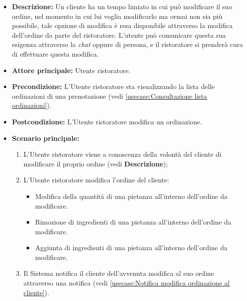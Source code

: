 \label{usecase:Modifica ordinazione}
\begin{itemize}

    \item \textbf{Descrizione:} Un cliente ha un tempo limiato in cui può modificare il suo ordine, nel momento in cui lui voglia modificarlo ma ormai non sia più possibile, tale opzione di modifica è resa disponibile 
    attraverso la modifica dell'ordine da parte del ristoratore. L'utente può comunicare questa sua esigenza attraverso la \textit{chat} oppure di persona, e il ristoratore si prenderà cura di effettuare questa modifica.
	
    \item \textbf{Attore principale:} Utente ristoratore.

	\item \textbf{Precondizione:} L'Utente ristoratore sta visualizzando la lista delle ordinazioni di una prenotazione (vedi \autoref{usecase:Consultazione lista ordinazioni}).

	\item \textbf{Postcondizione:} L'Utente ristoratore modifica un ordinazione.

	\item \textbf{Scenario principale:}
	\begin{enumerate}
		\item L'Utente ristoratore viene a conoscenza della volontà del cliente di modificare il proprio ordine (vedi \textbf{Descrizione});
		\item L'Utente ristoratore modifica l'ordine del cliente:
		\begin{itemize}
            \item Modifica della quantità di una pietanza all'interno dell'ordine da modificare.
			\item Rimozione di ingredienti di una pietanza all'interno dell'ordine da modificare.
			\item Aggiunta di ingredienti di una pietanza all'interno dell'ordine da modificare.
        \end{itemize}
        \item Il Sistema notifica il cliente dell'avvenuta modifica al suo ordine attraverso una notifica (vedi \autoref{usecase:Notifica modifica ordinazione al cliente}).
	\end{enumerate}

\end{itemize}

